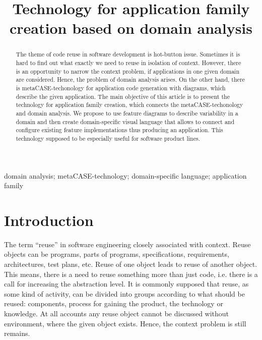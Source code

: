 \documentclass[conference]{IEEEtran}
\begin{document}
\title{Technology for application family creation based on domain analysis}

\author{
\and
}

\maketitle

\begin{abstract}
The theme of code reuse in software development is hot-button issue. Sometimes it is hard to find out what exactly we need to reuse in isolation of context. However, there is an opportunity to narrow the context problem, if applications in one given domain are considered. Hence, the problem of domain analysis arises. On the other hand, there is metaCASE-techonology for application code generation with diagrams, which describe the given application. The main objective of this article is to present the technology for application family creation, which connects the metaCASE-techonology and domain analysis. We propose to use feature diagrams to describe variability in a domain and then create domain-specific visual language that allows to connect and configure existing feature implementations thus producing an application. This technology supposed to be especially useful for software product lines.
\end{abstract}

\begin{IEEEkeywords} domain analysis; metaCASE-technology; domain-specific language; application family \end{IEEEkeywords}

\section{Introduction}
The term ``reuse'' in software engineering closely associated with context. Reuse objects can be programs, parts of programs, specifications, requirements, architectures, test plans, etc. Reuse of one object leads to reuse of  another object. This means, there is a need to reuse something more than just code, i.e. there is a call for increasing the abstraction level. It is commonly supposed that reuse, as some kind of activity, can be divided into groups according to what should be reused: components, process for gaining the product, the technology or knowledge. At all accounts any reuse object cannot be discussed without environment, where the given object exists. Hence, the context problem is still remains. 
\end{document}
